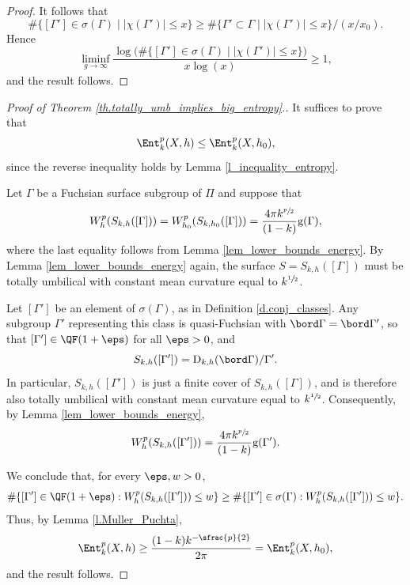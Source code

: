 \begin{proof}
It follows that
\begin{equation*}
\#\{[\Gamma']\in\sigma(\Gamma)\mid \left|\chi(\Gamma')\right| \leq x\}
\geq \#\{\Gamma'\subset\Gamma\mid \left|\chi(\Gamma')\right| \leq x\}/(x/x_0).
\end{equation*}
Hence
\begin{equation*}
\liminf_{g\to\infty}\frac{\log\bigl(\#\{[\Gamma']\in\sigma(\Gamma)\mid \left|\chi(\Gamma')\right|\leq x\}\bigr)}{x\log(x)} \geq 1,
\end{equation*}
and the result follows.
\end{proof}

\begin{proof}[Proof of Theorem \ref{th.totally_umb_implies_big_entropy}.] It suffices to prove that
\begin{equation*}
\Ent^{p}_{k}(X,h)\leq\Ent^{p}_{k}(X,h_0),
\end{equation*}
since the reverse inequality holds by Lemma \ref{l_inequality_entropy}.

Let $\Gamma$ be a Fuchsian surface subgroup of $\Pi$ and suppose that
\begin{equation*}
W^{p}_{h}(S_{k,h}([\Gamma]))=W^{p}_{h_0}(S_{k,h_0}([\Gamma]))=\frac{4\pi k^{\sfrac{p}{2}}}{(1-k)}\mathrm{g}(\Gamma),
\end{equation*}
where the last equality follows from Lemma \ref{lem_lower_bounds_energy}. By Lemma \ref{lem_lower_bounds_energy} again, the surface $S=S_{k,h}([\Gamma])$ must be totally umbilical with constant mean curvature equal to $k^{\sfrac{1}{2}}$.

Let $[\Gamma']$ be an element of $\sigma(\Gamma)$, as in Definition \ref{d.conj_classes}. Any subgroup $\Gamma'$ representing this class is quasi-Fuchsian with $\bord \Gamma=\bord \Gamma'$, so that $[\Gamma']\in\QF(1+\eps)$ for all $\eps>0$, and
\begin{equation*}
S_{k,h}([\Gamma'])=\mathrm{D}_{k,h}(\bord \Gamma)/\Gamma'.
\end{equation*}
In particular, $S_{k,h}([\Gamma'])$ is just a finite cover of $S_{k,h}([\Gamma])$, and is therefore also totally umbilical with constant mean curvature equal to $k^{\sfrac{1}{2}}$. Consequently, by Lemma \ref{lem_lower_bounds_energy},
\begin{equation*}
W^{p}_{h}(S_{k,h}([\Gamma']))=\frac{4\pi k^{\sfrac{p}{2}}}{(1-k)}\mathrm{g}(\Gamma').
\end{equation*}

We conclude that, for every $\eps,w>0$,
\begin{equation*}
\#\{[\Gamma']\in\QF(1+\eps):W^{p}_{h}(S_{k,h}([\Gamma']))\leq w\}\geq \#\{[\Gamma']\in\sigma(\Gamma):W^{p}_{h}(S_{k,h}([\Gamma']))\leq w\}.
\end{equation*}
Thus, by Lemma \ref{l.Muller_Puchta},
\begin{equation*}
\Ent^{p}_{k}(X,h)\geq\frac{(1-k)k^{-\sfrac{p}{2}}}{2\pi}=\Ent^{p}_{k}(X,h_0),
\end{equation*}
and the result follows.
\end{proof}

